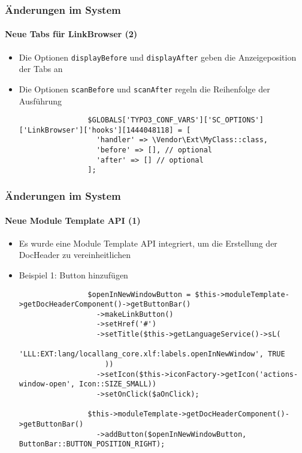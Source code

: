 \begin{frame}[fragile]
	\frametitle{Änderungen im System}
	\framesubtitle{Neue Tabs für LinkBrowser (2)}

	\lstset{basicstyle=\tiny\ttfamily}

	\begin{itemize}

		\item Die Optionen \texttt{displayBefore} und \texttt{displayAfter} geben die Anzeigeposition der Tabs an
		\item Die Optionen \texttt{scanBefore} und \texttt{scanAfter} regeln die Reihenfolge der Ausführung
			\begin{lstlisting}
				$GLOBALS['TYPO3_CONF_VARS']['SC_OPTIONS']['LinkBrowser']['hooks'][1444048118] = [
				  'handler' => \Vendor\Ext\MyClass::class,
				  'before' => [], // optional
				  'after' => [] // optional
				];
			\end{lstlisting}

	\end{itemize}

\end{frame}


\begin{frame}[fragile]
	\frametitle{Änderungen im System}
	\framesubtitle{Neue Module Template API (1)}

	\lstset{basicstyle=\tiny\ttfamily}

	\begin{itemize}

		\item Es wurde eine Module Template API integriert, um die Erstellung der DocHeader zu vereinheitlichen

		\item Beispiel 1: Button hinzufügen

			\begin{lstlisting}
				$openInNewWindowButton = $this->moduleTemplate->getDocHeaderComponent()->getButtonBar()
				  ->makeLinkButton()
				  ->setHref('#')
				  ->setTitle($this->getLanguageService()->sL(
				    'LLL:EXT:lang/locallang_core.xlf:labels.openInNewWindow', TRUE
				    ))
				  ->setIcon($this->iconFactory->getIcon('actions-window-open', Icon::SIZE_SMALL))
				  ->setOnClick($aOnClick);

				$this->moduleTemplate->getDocHeaderComponent()->getButtonBar()
				  ->addButton($openInNewWindowButton, ButtonBar::BUTTON_POSITION_RIGHT);
			\end{lstlisting}
	\end{itemize}

\end{frame}

